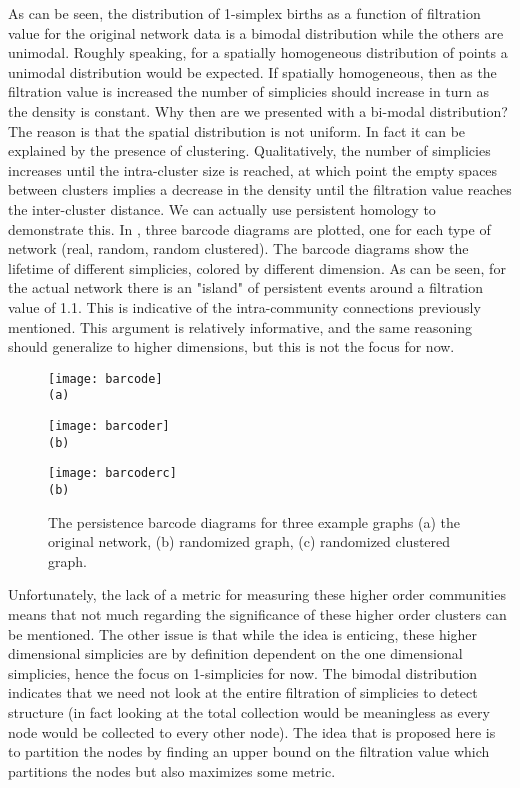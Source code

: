 \documentclass[letter,10pt,openany]{article}
\begin{document}
As can be seen, the distribution of 1-simplex births
as a function of filtration value for the original network data is a bimodal distribution
while the others are unimodal. Roughly speaking,
 for a spatially homogeneous distribution of points
a unimodal distribution would be expected. If spatially homogeneous,
then as the filtration value is increased the number of simplicies should increase in turn as the
density is constant. Why then are we presented with a bi-modal distribution?
The reason is that the spatial distribution is not uniform.
In fact it can be explained by the presence of clustering.
Qualitatively, the number of simplicies
increases until the intra-cluster size is reached,
 at which point the empty spaces between clusters
implies a decrease in the density until the filtration
value reaches the inter-cluster distance. We can actually use
persistent homology to demonstrate this.
In , three barcode diagrams are plotted, one
for each type of network (real, random, random clustered). The
barcode diagrams show the lifetime of
different simplicies, colored by different dimension. As can be seen, for the actual network there is an "island" of persistent events around a filtration value of 1.1.
This is indicative of the intra-community connections previously mentioned.
This argument is relatively informative, and the same reasoning should generalize to higher dimensions, but this is not the focus for now.
\begin{figure}[H]
\begin{minipage}[height=.5\textheight]{.48\textwidth}
\centering
\texttt{[image: barcode]}
\\ \small{\texttt{(a)}}
\end{minipage}
\begin{minipage}[height=.5\textheight]{.48\textwidth}
\centering
\texttt{[image: barcoder]}
\\ \small{\texttt{(b)}}
\end{minipage}
\begin{minipage}[height=.5\textheight]{.48\textwidth}
\centering
\texttt{[image: barcoderc]}
\\ \small{\texttt{(b)}}
\end{minipage}
\caption{\label{barcode}
The persistence barcode diagrams for three example graphs (a) the original network,
(b) randomized graph, (c) randomized clustered graph.
}
\end{figure}

Unfortunately, the lack of a metric for measuring these higher order communities means that
not much regarding the significance of these higher order clusters can be mentioned. The other issue is that while the idea is enticing, these higher dimensional simplicies are by definition dependent
on the one dimensional simplicies, hence the focus on 1-simplicies for now.
The bimodal distribution indicates that we need not look at the entire filtration of simplicies
to detect structure (in fact looking at the total collection would be meaningless as every node would
be collected to every other node). The idea that is proposed here is to partition the nodes
by finding an upper bound on the filtration value which partitions the nodes but also maximizes some metric.
\end{document}
